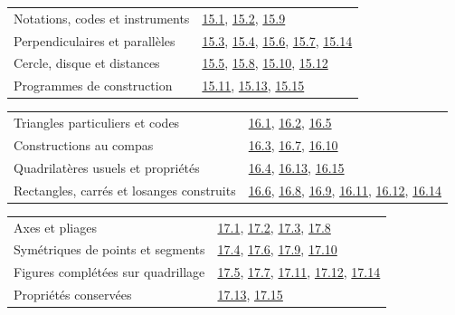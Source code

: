 \begin{tabularx}{\linewidth}{@{}Yl@{}}\toprule
Notations, codes et instruments & \hyperref[exo-15-1]{15.1}, \hyperref[exo-15-2]{15.2}, \hyperref[exo-15-9]{15.9}\\[2mm]
Perpendiculaires et parallèles & \hyperref[exo-15-3]{15.3}, \hyperref[exo-15-4]{15.4}, \hyperref[exo-15-6]{15.6}, \hyperref[exo-15-7]{15.7}, \hyperref[exo-15-14]{15.14}\\[2mm]
Cercle, disque et distances & \hyperref[exo-15-5]{15.5}, \hyperref[exo-15-8]{15.8}, \hyperref[exo-15-10]{15.10}, \hyperref[exo-15-12]{15.12}\\[2mm]
Programmes de construction & \hyperref[exo-15-11]{15.11}, \hyperref[exo-15-13]{15.13}, \hyperref[exo-15-15]{15.15}\\[2mm]
\bottomrule\end{tabularx}\par\vspace{4mm}
\clearpage
{}\fontsize{10}{13}\selectfont
{}\begin{tabularx}{\linewidth}{@{}Yl@{}}\toprule
Triangles particuliers et codes & \hyperref[exo-16-1]{16.1}, \hyperref[exo-16-2]{16.2}, \hyperref[exo-16-5]{16.5}\\[2mm]
Constructions au compas & \hyperref[exo-16-3]{16.3}, \hyperref[exo-16-7]{16.7}, \hyperref[exo-16-10]{16.10}\\[2mm]
Quadrilatères usuels et propriétés & \hyperref[exo-16-4]{16.4}, \hyperref[exo-16-13]{16.13}, \hyperref[exo-16-15]{16.15}\\[2mm]
Rectangles, carrés et losanges construits & \hyperref[exo-16-6]{16.6}, \hyperref[exo-16-8]{16.8}, \hyperref[exo-16-9]{16.9}, \hyperref[exo-16-11]{16.11}, \hyperref[exo-16-12]{16.12}, \hyperref[exo-16-14]{16.14}\\[2mm]
\bottomrule\end{tabularx}\par\vspace{4mm}
\begin{tabularx}{\linewidth}{@{}Yl@{}}\toprule
Axes et pliages & \hyperref[exo-17-1]{17.1}, \hyperref[exo-17-2]{17.2}, \hyperref[exo-17-3]{17.3}, \hyperref[exo-17-8]{17.8}\\[2mm]
Symétriques de points et segments & \hyperref[exo-17-4]{17.4}, \hyperref[exo-17-6]{17.6}, \hyperref[exo-17-9]{17.9}, \hyperref[exo-17-10]{17.10}\\[2mm]
Figures complétées sur quadrillage & \hyperref[exo-17-5]{17.5}, \hyperref[exo-17-7]{17.7}, \hyperref[exo-17-11]{17.11}, \hyperref[exo-17-12]{17.12}, \hyperref[exo-17-14]{17.14}\\[2mm]
Propriétés conservées & \hyperref[exo-17-13]{17.13}, \hyperref[exo-17-15]{17.15}\\[2mm]
\bottomrule\end{tabularx}\par\vspace{4mm}
